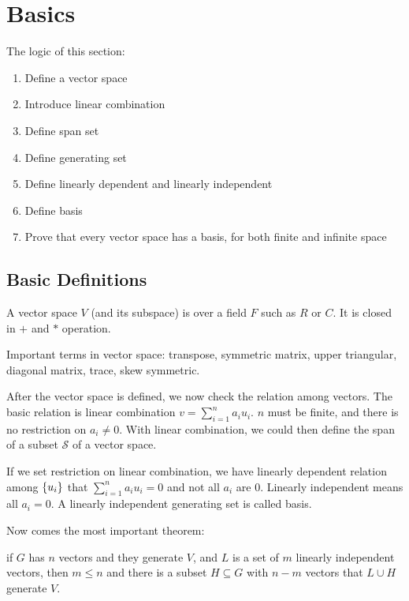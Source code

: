 \section{Basics}

The logic of this section:
\begin{enumerate}
    \item Define a vector space
    \item Introduce linear combination
    \item Define span set
    \item Define generating set
    \item Define linearly dependent and linearly independent
    \item Define basis
    \item Prove that every vector space has a basis, for both finite and infinite space
\end{enumerate}

\subsection{Basic Definitions}



A vector space $V$ (and its subspace) is over a field $F$ such as $R$ or $C$. It is closed in $+$ and $*$ operation.


Important terms in vector space: transpose, symmetric matrix, upper triangular, diagonal matrix, trace, skew symmetric.

After the vector space is defined, we now check the relation among vectors. The basic relation is linear combination $v = \sum_{i=1}^{n} a_i u_i$. $n$ must be finite, and there is no restriction on $a_i \neq 0$. With linear combination, we could then define the span of a subset $\mathcal{S}$ of a vector space. 

If we set restriction on linear combination, we have linearly dependent relation among $\set{u_i}$ that $\sum_{i=1}^{n} a_i u_i = 0$ and not all $a_i$ are $0$. Linearly independent means all $a_i = 0$. A linearly independent generating set is called basis.

Now comes the most important theorem:
\begin{theorem}\label{replacement_theorem}
    if $G$ has $n$ vectors and they generate $V$, and $L$ is a set of $m$ linearly independent vectors, then $m \leq n$ and there is a subset $H \subseteq G$ with $n-m$ vectors that $L \cup H $ generate $V$.
    
\end{theorem}

